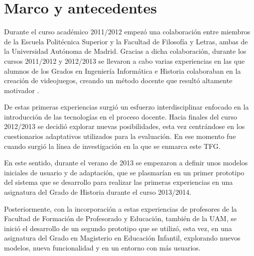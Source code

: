 


\section{Marco y antecedentes}


Durante el curso académico 2011/2012 empezó una colaboración entre miembros de la Escuela Politécnica Superior y la Facultad de Filosofía y Letras, ambas de la Universidad Autónoma de Madrid. Gracias a dicha colaboración, durante los cursos 2011/2012 y 2012/2013 se llevaron a cabo varias experiencias en las que alumnos de los Grados en Ingeniería Informática e Historia colaboraban en la creación de videojuegos, creando un método docente que resultó altamente motivador \cite{Sevilla12}\cite{Molins14Videogames}.

De estas primeras experiencias surgió un esfuerzo interdisciplinar enfocado en la introducción de las tecnologías en el proceso docente. Hacia finales del curso 2012/2013 se decidió explorar nuevas posibilidades, esta vez centrándose en los cuestionarios adaptativos utilizados para la evaluación. En ese momento fue cuando surgió la línea de investigación en la que se enmarca este TFG. 

En este sentido, durante el verano de 2013 se empezaron a definir unos modelos iniciales de usuario y de adaptación, que se plasmarían en un primer prototipo del sistema que se desarrollo para realizar las primeras experiencias en una asignatura del Grado de Historia durante el curso 2013/2014.

Posteriormente, con la incorporación a estas experiencias de profesores de la Facultad de Formación de Profesorado y Educación, también de la UAM, se inició el desarrollo de un segundo prototipo que se utilizó, esta vez, en una asignatura del Grado en Magisterio en Educación Infantil, explorando nuevos modelos, nueva funcionalidad y en un entorno con más usuarios.

